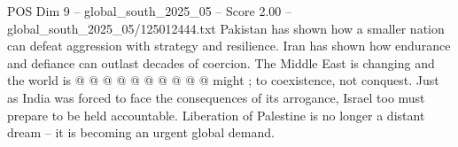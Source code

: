 \begin{textsample}{POS Dim 9 – global\_south\_2025\_05 – Score 2.00 – global\_south\_2025\_05/125012444.txt}
Pakistan has shown how a smaller nation can defeat aggression with strategy and resilience.
Iran has shown how endurance and defiance can outlast decades of coercion.
The Middle East is changing and the world is @ @ @ @ @ @ @ @ @ @ might ; to coexistence, not conquest.
Just as India was forced to face the consequences of its arrogance, Israel too must prepare to be held accountable.
Liberation of Palestine is no longer a distant dream -- it is becoming an urgent global demand.

\end{textsample}

